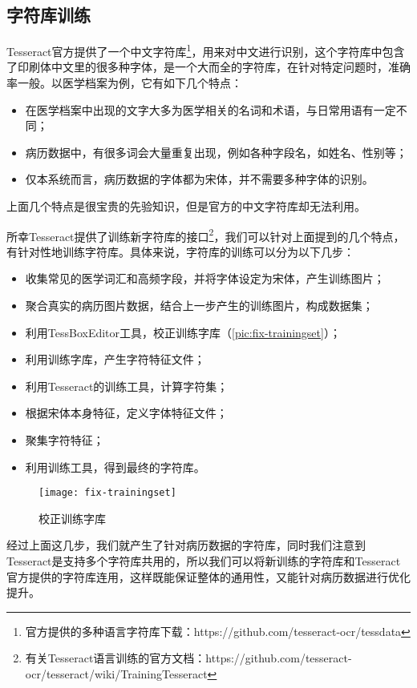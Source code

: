 \subsection{字符库训练}
Tesseract官方提供了一个中文字符库\footnote{官方提供的多种语言字符库下载：https://github.com/tesseract-ocr/tessdata}，用来对中文进行识别，这个字符库中包含了印刷体中文里的很多种字体，是一个大而全的字符库，在针对特定问题时，准确率一般。以医学档案为例，它有如下几个特点：
\begin{itemize}
	\item 在医学档案中出现的文字大多为医学相关的名词和术语，与日常用语有一定不同；
	\item 病历数据中，有很多词会大量重复出现，例如各种字段名，如姓名、性别等；
	\item 仅本系统而言，病历数据的字体都为宋体，并不需要多种字体的识别。
\end{itemize}
上面几个特点是很宝贵的先验知识，但是官方的中文字符库却无法利用。

所幸Tesseract提供了训练新字符库的接口\footnote{有关Tesseract语言训练的官方文档：https://github.com/tesseract-ocr/tesseract/wiki/TrainingTesseract}，我们可以针对上面提到的几个特点，有针对性地训练字符库。具体来说，字符库的训练可以分为以下几步：
\begin{itemize}
	\item 收集常见的医学词汇和高频字段，并将字体设定为宋体，产生训练图片；
	\item 聚合真实的病历图片数据，结合上一步产生的训练图片，构成数据集；
	\item 利用TessBoxEditor工具，校正训练字库（\autoref{pic:fix-trainingset}）；
	\item 利用训练字库，产生字符特征文件；
	\item 利用Tesseract的训练工具，计算字符集；
	\item 根据宋体本身特征，定义字体特征文件；
	\item 聚集字符特征；
	\item 利用训练工具，得到最终的字符库。
\end{itemize}

\begin{figure}
	\centering
	\caption{校正训练字库}
	\texttt{[image: fix-trainingset]}
	\label{pic:fix-trainingset}
\end{figure}
经过上面这几步，我们就产生了针对病历数据的字符库，同时我们注意到Tesseract是支持多个字符库共用的，所以我们可以将新训练的字符库和Tesseract官方提供的字符库连用，这样既能保证整体的通用性，又能针对病历数据进行优化提升。

